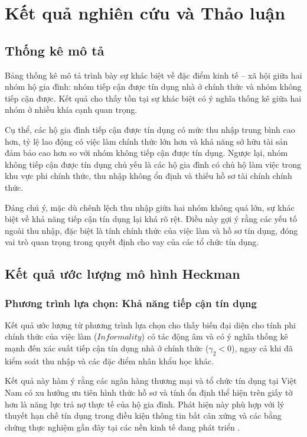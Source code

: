 \documentclass[12pt,a4paper]{report}
\begin{document}
\chapter{Kết quả nghiên cứu và Thảo luận}

\section{Thống kê mô tả}

Bảng thống kê mô tả trình bày sự khác biệt về đặc điểm kinh tế – xã hội giữa hai nhóm hộ gia đình: nhóm tiếp cận được tín dụng nhà ở chính thức và nhóm không tiếp cận được. Kết quả cho thấy tồn tại sự khác biệt có ý nghĩa thống kê giữa hai nhóm ở nhiều khía cạnh quan trọng.

Cụ thể, các hộ gia đình tiếp cận được tín dụng có mức thu nhập trung bình cao hơn, tỷ lệ lao động có việc làm chính thức lớn hơn và khả năng sở hữu tài sản đảm bảo cao hơn so với nhóm không tiếp cận được tín dụng. Ngược lại, nhóm không tiếp cận được tín dụng chủ yếu là các hộ gia đình có chủ hộ làm việc trong khu vực phi chính thức, thu nhập không ổn định và thiếu hồ sơ tài chính chính thức.

Đáng chú ý, mặc dù chênh lệch thu nhập giữa hai nhóm không quá lớn, sự khác biệt về khả năng tiếp cận tín dụng lại khá rõ rệt. Điều này gợi ý rằng các yếu tố ngoài thu nhập, đặc biệt là tính chính thức của việc làm và hồ sơ tín dụng, đóng vai trò quan trọng trong quyết định cho vay của các tổ chức tín dụng.

\section{Kết quả ước lượng mô hình Heckman}

\subsection{Phương trình lựa chọn: Khả năng tiếp cận tín dụng}

Kết quả ước lượng từ phương trình lựa chọn cho thấy biến đại diện cho tính phi chính thức của việc làm ($Informality$) có tác động âm và có ý nghĩa thống kê mạnh đến xác suất tiếp cận tín dụng nhà ở chính thức ($\gamma_2 < 0$), ngay cả khi đã kiểm soát thu nhập và các đặc điểm nhân khẩu học khác.

Kết quả này hàm ý rằng các ngân hàng thương mại và tổ chức tín dụng tại Việt Nam có xu hướng ưu tiên hình thức hồ sơ và tính ổn định thể hiện trên giấy tờ hơn là năng lực trả nợ thực tế của hộ gia đình. Phát hiện này phù hợp với lý thuyết hạn chế tín dụng trong điều kiện thông tin bất cân xứng và các bằng chứng thực nghiệm gần đây tại các nền kinh tế đang phát triển \parencite{WB2023}.
\end{document}
